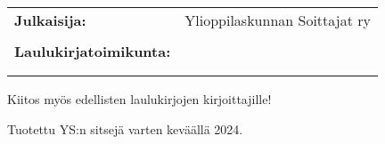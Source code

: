 \newdoublepage


\thispagestyle{empty}

\begin{footnotesize}
	
	\newlength{\currentparskip}
	\setlength{\currentparskip}{\parskip} %
	
	\null
	\vfill
	\begin{minipage}{\textwidth}
	
	    \setlength{\parskip}{\currentparskip} %
	    
	    \begin{tabular}{l l}
			\textbf{Julkaisija:}			& Ylioppilaskunnan Soittajat ry				\\
											&							\\
			\textbf{Laulukirjatoimikunta:}	& \citeauthor{anton_taleiko}    \\
                                            & \citeauthor{ronja_forsen}	\\
                                            & \citeauthor{sara_tahvonen}		\\
	    \end{tabular}
	    
	    \vspace{.2cm}
	    
	    Kiitos myös edellisten laulukirjojen kirjoittajille!

        Tuotettu YS:n sitsejä varten keväällä 2024.
	
	\end{minipage}
		
\end{footnotesize}








	

